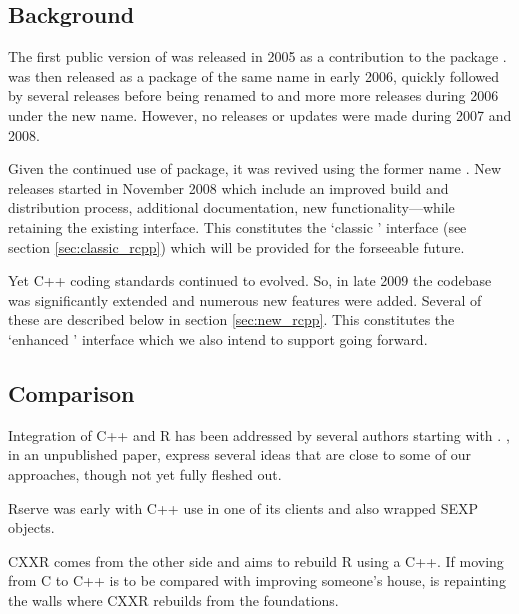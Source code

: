 \subsection{Background}

The first public version of  was released in 2005 as a contribution
to the  package \citep{eddelbuettelkhan09:rquantlib}.
 was then released as a package of the same name in early 2006,
quickly followed by several releases before being renamed to
 and more more releases during 2006 under the new name.
However, no releases or updates were made during 2007 and 2008.

Given the continued use of package, it was revived using the former name
. New releases started in November 2008 which include an improved
build and distribution process, additional documentation, new
functionality---while retaining the existing interface.  This constitutes the
`classic ' interface (see section \ref{sec:classic_rcpp}) which will be provided for
the forseeable future.

Yet C++ coding standards continued to evolved. So, in late 2009 the codebase
was significantly extended and numerous new features were added.  Several of
these are described below in section \ref{sec:new_rcpp}. This constitutes the `enhanced
' interface which we also intend to support going forward.

\subsection{Comparison}

Integration of C++ and R has been addressed by several authors starting with
\cite{batesdebroy01:cppclasses}. \cite{javagailemanly07:r_cpp}, in an
unpublished paper, express several ideas that are close to some of our
approaches, though not yet fully fleshed out.

Rserve \citep{cran:Rserve} was early with C++ use in one 
of its clients and also wrapped SEXP objects. 

CXXR \citep{runnalls09:cxxr} comes from the other side 
and aims to rebuild R using a C++. If moving from C to C++ is to be
compared with improving someone's house,  is repainting the 
walls where CXXR rebuilds from the foundations. 

